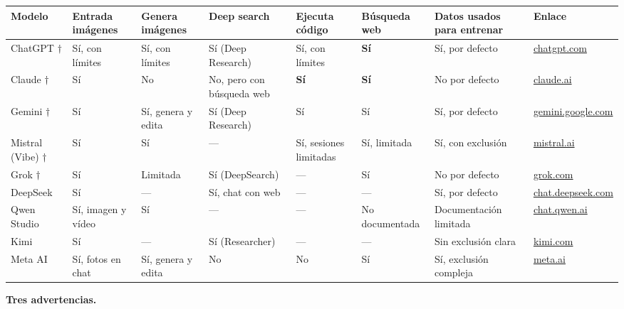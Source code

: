 \documentclass[a4paper,10pt]{article}
\begin{document}
\begin{tabularx}{\textwidth}{|>{\raggedright\arraybackslash}X|
>{\centering\arraybackslash}m{2.3cm}|
>{\centering\arraybackslash}m{2.3cm}|
>{\centering\arraybackslash}m{2.3cm}|
>{\centering\arraybackslash}m{2.3cm}|
>{\centering\arraybackslash}m{2.1cm}|
>{\centering\arraybackslash}m{2.1cm}|
>{\raggedright\arraybackslash}X|}
\hline
\rowcolor{blue!40}
\textbf{Modelo} & \textbf{Entrada imágenes} & \textbf{Genera imágenes} & \textbf{Deep search} & \textbf{Ejecuta código} & \textbf{Búsqueda web} & \textbf{Datos usados para entrenar} & \textbf{Enlace} \\
\hline
ChatGPT $\dagger$ & Sí, con límites & Sí, con límites & Sí (Deep Research) & Sí, con límites & \textbf{Sí} & Sí, por defecto & \href{https://chatgpt.com}{chatgpt.com} \\
\hline
Claude $\dagger$ & Sí & No & No, pero con búsqueda web & \textbf{Sí} & \textbf{Sí} & No por defecto & \href{https://claude.ai}{claude.ai} \\
\hline
Gemini $\dagger$ & Sí & Sí, genera y edita & Sí (Deep Research) & Sí & Sí & Sí, por defecto & \href{https://gemini.google.com}{gemini.google.com} \\
\hline
Mistral (Vibe) $\dagger$ & Sí & Sí & --- & Sí, sesiones limitadas & Sí, limitada & Sí, con exclusión & \href{https://mistral.ai}{mistral.ai} \\
\hline
Grok $\dagger$ & Sí & Limitada & Sí (DeepSearch) & --- & Sí & No por defecto & \href{https://grok.com}{grok.com} \\
\hline
DeepSeek & Sí & --- & Sí, chat con web & --- & --- & Sí, por defecto & \href{https://chat.deepseek.com}{chat.deepseek.com} \\
\hline
Qwen Studio & Sí, imagen y vídeo & Sí & --- & --- & No documentada & Documentación limitada & \href{https://chat.qwen.ai}{chat.qwen.ai} \\
\hline
Kimi & Sí & --- & Sí (Researcher) & --- & --- & Sin exclusión clara & \href{https://www.kimi.com}{kimi.com} \\
\hline
Meta AI & Sí, fotos en chat & Sí, genera y edita & No & No & Sí & Sí, exclusión compleja & \href{https://www.meta.ai}{meta.ai} \\
\hline
\end{tabularx}

\vspace{0.5cm}

\noindent\textbf{Tres advertencias.}
\end{document}
